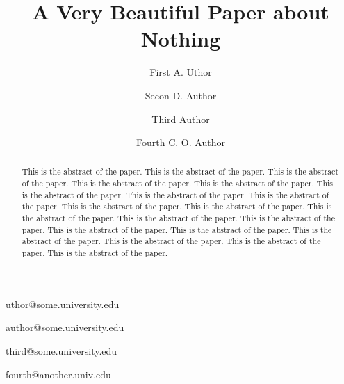 \documentclass{jgaa-art}
\begin{document}
\title{A Very Beautiful Paper about Nothing}

\author[first,second,third]{First A. Uthor}{uthor@some.university.edu}
\author[first]{Secon D. Author}{author@some.university.edu}
\author[first]{Third Author}{third@some.university.edu}
\author[second,third]{Fourth C. O. Author}{fourth@another.univ.edu}





%
%
%
%
%
%
%
%
%
%

\maketitle

\begin{abstract}
This is the abstract of the paper. This is the abstract of the paper. This is the abstract of the paper. This is the abstract of the paper. This is
the abstract of the paper. This is the abstract of the paper. This is the abstract of the paper. This is the abstract of the paper. This is the
abstract of the paper. This is the abstract of the paper. This is the abstract of the paper. This is the abstract of the paper. This is the abstract
of the paper. This is the abstract of the paper. This is the abstract of the paper. This is the abstract of the paper. This is the abstract of the
paper. This is the abstract of the paper. This is the abstract of the paper.
\end{abstract}
\end{document}
